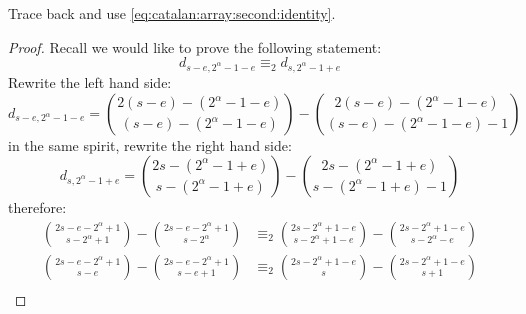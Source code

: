 Trace back and use \autoref{eq:catalan:array:second:identity}. 
\begin{proof}
Recall we would like to prove the following statement:
\begin{displaymath}
    d_{s-e,2^{{\alpha}}-1-e} \equiv_{2} d_{s,2^{{\alpha}}-1+e}
\end{displaymath}
Rewrite the left hand side:
\begin{displaymath}
    d_{s-e,2^{{\alpha}}-1-e}= {{2(s-e)-(2^{{\alpha}}-1-e)}\choose{(s-e)-(2^{{\alpha}}-1-e)}}
        - {{2(s-e)-(2^{{\alpha}}-1-e)}\choose{(s-e)-(2^{{\alpha}}-1-e)-1}}
\end{displaymath}
in the same spirit, rewrite the right hand side:
\begin{displaymath}
    d_{s,2^{{\alpha}}-1+e}={{2s-(2^{{\alpha}}-1+e)}\choose{s-(2^{{\alpha}}-1+e)}}
        - {{2s-(2^{{\alpha}}-1+e)}\choose{s-(2^{{\alpha}}-1+e)-1}}
\end{displaymath}
therefore:
\begin{displaymath}
    \begin{split}
        {{2s-e-2^{{\alpha}}+1}\choose{s-2^{{\alpha}}+1}}
            - {{2s-e-2^{{\alpha}}+1}\choose{s-2^{{\alpha}}}}
        &\equiv_{2}
        {{2s-2^{{\alpha}}+1-e}\choose{s-2^{{\alpha}}+1-e}}
            - {{2s-2^{{\alpha}}+1-e}\choose{s-2^{{\alpha}}-e}}\\
        {{2s-e-2^{{\alpha}}+1}\choose{s-e}}
            - {{2s-e-2^{{\alpha}}+1}\choose{s-e+1}}
        &\equiv_{2}
        {{2s-2^{{\alpha}}+1-e}\choose{s}}
            - {{2s-2^{{\alpha}}+1-e}\choose{s+1}}\\
    \end{split}
\end{displaymath}


\end{proof}
